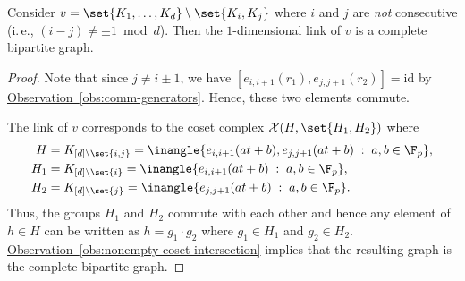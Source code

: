 \documentclass[11pt]{article}
\newcommand{\expref}[2]{\texorpdfstring{\hyperref[#2]{#1~\ref{#2}}}{#1~\ref{#2}}}
\newcommand{\ie}{i.\,e.}
\begin{document}
\begin{observation}
  Consider $v = \set{K_1,\ldots, K_d} \setminus \set{K_i,K_j}$ where $i$ and $j$ are \emph{not} consecutive (\ie, $(i-j) \neq \pm 1 \bmod d$). Then the $1$-dimensional link of $v$ is a complete bipartite graph.
\end{observation}
\begin{proof}
  Note that since $j \neq i\pm 1$, we have $[e_{i,i+1}(r_1), e_{j,j+1}(r_2)] = \mathrm{id}$ by \expref{Observation}{obs:comm-generators}. Hence, these two elements commute.

  The link of $v$ corresponds to the coset complex $\mathcal{X}(H,\set{H_1,H_2})$ where
  \begin{align*}
    H & = K_{[d]\setminus\set{i,j}} =  \inangle{e_{i,i+1}(at+b),e_{j,j+1}(at+b) \;:\; a,b\in \F_p},\\
    H_1 & = K_{[d]\setminus\set{i}} =  \inangle{e_{i,i+1}(at+b) \;:\; a,b\in \F_p},\\
    H_2 & = K_{[d]\setminus\set{j}} =  \inangle{e_{j,j+1}(at+b) \;:\; a,b\in \F_p}.
  \end{align*}
  Thus, the groups $H_1$ and $H_2$ commute with each other and hence any element of $h\in H$ can be written as $h = g_1 \cdot g_2$ where $g_1 \in H_1$ and $g_2 \in H_2$. \expref{Observation}{obs:nonempty-coset-intersection} implies that the resulting graph is the complete bipartite graph.    
\end{proof}
\end{document}

